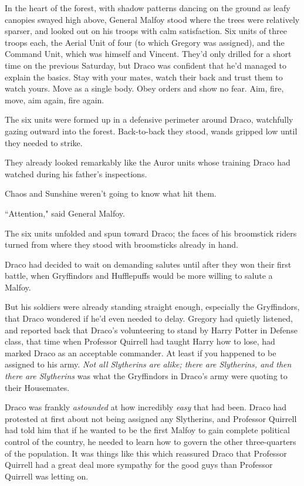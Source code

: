 In the heart of the forest, with shadow patterns dancing on the ground as leafy canopies swayed high above, General Malfoy stood where the trees were relatively sparser, and looked out on his troops with calm satisfaction. Six units of three troops each, the Aerial Unit of four (to which Gregory was assigned), and the Command Unit, which was himself and Vincent. They'd only drilled for a short time on the previous Saturday, but Draco was confident that he'd managed to explain the basics. Stay with your mates, watch their back and trust them to watch yours. Move as a single body. Obey orders and show no fear. Aim, fire, move, aim again, fire again.

The six units were formed up in a defensive perimeter around Draco, watchfully gazing outward into the forest. Back-to-back they stood, wands gripped low until they needed to strike.

They already looked remarkably like the Auror units whose training Draco had watched during his father's inspections.

Chaos and Sunshine weren't going to know what hit them.

``Attention," said General Malfoy.

The six units unfolded and spun toward Draco; the faces of his broomstick riders turned from where they stood with broomsticks already in hand.

Draco had decided to wait on demanding salutes until after they won their first battle, when Gryffindors and Hufflepuffs would be more willing to salute a Malfoy.

But his soldiers were already standing straight enough, especially the Gryffindors, that Draco wondered if he'd even needed to delay. Gregory had quietly listened, and reported back that Draco's volunteering to stand by Harry Potter in Defense class, that time when Professor Quirrell had taught Harry how to lose, had marked Draco as an acceptable commander. At least if you happened to be assigned to his army. \emph{Not all Slytherins are alike; there are Slytherins, and then there are Slytherins} was what the Gryffindors in Draco's army were quoting to their Housemates.

Draco was frankly \emph{astounded} at how incredibly \emph{easy} that had been. Draco had protested at first about not being assigned any Slytherins, and Professor Quirrell had told him that if he wanted to be the first Malfoy to gain complete political control of the country, he needed to learn how to govern the other three-quarters of the population. It was things like this which reassured Draco that Professor Quirrell had a great deal more sympathy for the good guys than Professor Quirrell was letting on.


